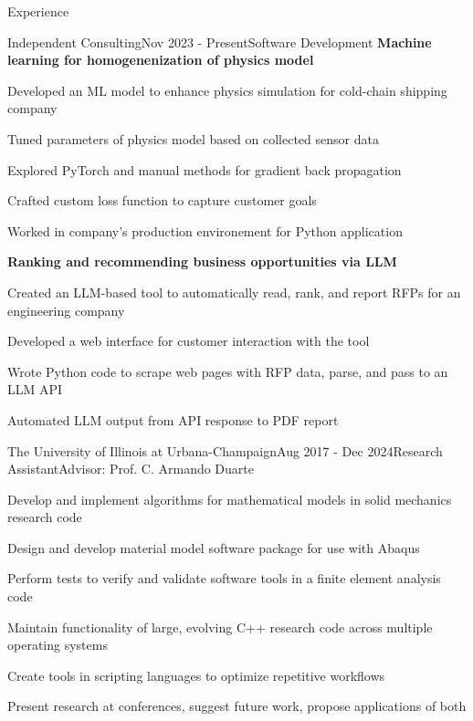 \documentclass{resume} %
\begin{document}

\begin{rSection}{Experience}

\begin{rSubsection}{Independent Consulting}{Nov 2023 - Present}{Software Development}{}
  \hspace{-10pt}\textbf{Machine learning for homogenenization of physics model}
  \item Developed an ML model to enhance physics simulation for cold-chain shipping company
  \item Tuned parameters of physics model based on collected sensor data
  \item Explored PyTorch and manual methods for gradient back propagation
  \item Crafted custom loss function to capture customer goals
  \item Worked in company's production environement for Python application

  \hspace{-10pt}\textbf{Ranking and recommending business opportunities via LLM}
  \item Created an LLM-based tool to automatically read, rank, and report RFPs for an engineering company
  \item Developed a web interface for customer interaction with the tool
  \item Wrote Python code to scrape web pages with RFP data, parse, and pass to an LLM API
  \item Automated LLM output from API response to PDF report
\end{rSubsection}

\begin{rSubsection}{The University of Illinois at Urbana-Champaign}{Aug 2017 - Dec 2024}{Research Assistant}{Advisor: Prof. C. Armando Duarte}
\item Develop and implement algorithms for mathematical models in solid mechanics research code
\item Design and develop material model software package for use with Abaqus
\item Perform tests to verify and validate software tools in a finite element analysis code
\item Maintain functionality of large, evolving C++ research code across multiple operating systems
\item Create tools in scripting languages to optimize repetitive workflows
\item Present research at conferences, suggest future work, propose applications of both
\end{rSubsection}


\end{rSection}
\end{document}
